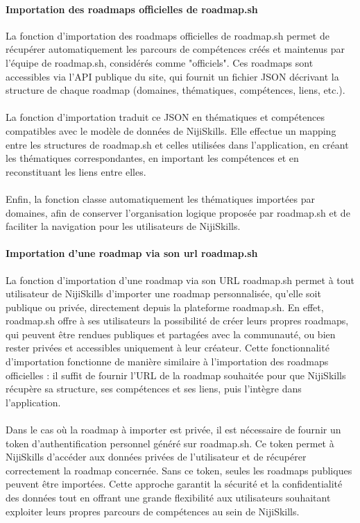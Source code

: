 \documentclass[12pt]{article}
\begin{document}
\paragraph{Importation des roadmaps officielles de roadmap.sh\\}
La fonction d'importation des roadmaps officielles de roadmap.sh permet de récupérer automatiquement les parcours de compétences créés et maintenus par l'équipe de roadmap.sh, considérés comme "officiels". Ces roadmaps sont accessibles via l'API publique du site, qui fournit un fichier JSON décrivant la structure de chaque roadmap (domaines, thématiques, compétences, liens, etc.).
\\\\
La fonction d'importation traduit ce JSON en thématiques et compétences compatibles avec le modèle de données de NijiSkills. Elle effectue un mapping entre les structures de roadmap.sh et celles utilisées dans l'application, en créant les thématiques correspondantes, en important les compétences et en reconstituant les liens entre elles.
\\\\
Enfin, la fonction classe automatiquement les thématiques importées par domaines, afin de conserver l'organisation logique proposée par roadmap.sh et de faciliter la navigation pour les utilisateurs de NijiSkills.
\paragraph{Importation d'une roadmap via son url roadmap.sh\\}
La fonction d'importation d'une roadmap via son URL roadmap.sh permet à tout utilisateur de NijiSkills d'importer une roadmap personnalisée, qu'elle soit publique ou privée, directement depuis la plateforme roadmap.sh. En effet, roadmap.sh offre à ses utilisateurs la possibilité de créer leurs propres roadmaps, qui peuvent être rendues publiques et partagées avec la communauté, ou bien rester privées et accessibles uniquement à leur créateur. Cette fonctionnalité d'importation fonctionne de manière similaire à l'importation des roadmaps officielles : il suffit de fournir l'URL de la roadmap souhaitée pour que NijiSkills récupère sa structure, ses compétences et ses liens, puis l'intègre dans l'application.
\\\\
Dans le cas où la roadmap à importer est privée, il est nécessaire de fournir un token d'authentification personnel généré sur roadmap.sh. Ce token permet à NijiSkills d'accéder aux données privées de l'utilisateur et de récupérer correctement la roadmap concernée. Sans ce token, seules les roadmaps publiques peuvent être importées. Cette approche garantit la sécurité et la confidentialité des données tout en offrant une grande flexibilité aux utilisateurs souhaitant exploiter leurs propres parcours de compétences au sein de NijiSkills.
\end{document}
